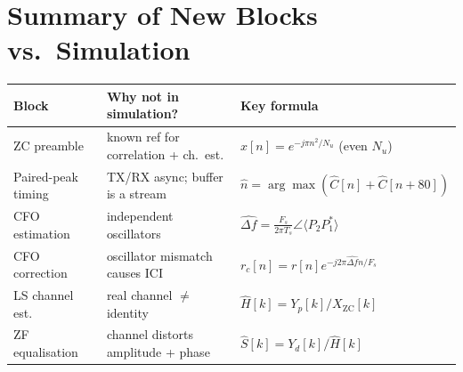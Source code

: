 \documentclass[11pt,a4paper]{article}
\begin{document}
\section*{Summary of New Blocks vs.\ Simulation}

\begin{center}
\begin{tabular}{lll}
\toprule
\textbf{Block} & \textbf{Why not in simulation?} & \textbf{Key formula} \\
\midrule
ZC preamble & known ref for correlation + ch.\ est. &
  $x[n]=e^{-j\pi n^2/N_u}$ (even $N_u$) \\
Paired-peak timing & TX/RX async; buffer is a stream &
  $\hat{n}=\arg\max(\hat{C}[n]+\hat{C}[n+80])$ \\
CFO estimation & independent oscillators &
  $\hat{\Delta f}=\frac{F_s}{2\pi T_s}\angle\langle P_2 P_1^*\rangle$ \\
CFO correction & oscillator mismatch causes ICI &
  $r_c[n]=r[n]e^{-j2\pi\hat{\Delta f}n/F_s}$ \\
LS channel est. & real channel $\neq$ identity &
  $\hat{H}[k]=Y_p[k]/X_{\text{ZC}}[k]$ \\
ZF equalisation & channel distorts amplitude + phase &
  $\hat{S}[k]=Y_d[k]/\hat{H}[k]$ \\
\bottomrule
\end{tabular}
\end{center}
\end{document}

